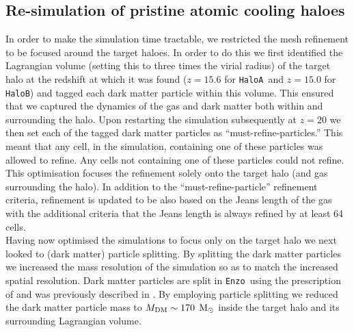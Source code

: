 \documentclass[graphics, twocolumn, usenatbib]{mn2e}
\newcommand{\enzo}{\texttt{Enzo~}}
\newcommand{\msolar} {$\rm{M_{\odot}}~$}
\newcommand{\ha} {\texttt{HaloA~}}
\newcommand{\hbc} {\texttt{HaloB}}
\begin{document}
 \subsection{Re-simulation of pristine atomic cooling haloes} \label{Sec:Resimulation}
In order to make the simulation time tractable, we restricted the mesh refinement to be focused
around the target haloes. In order to do this we first identified the Lagrangian
volume (setting this to three times the virial radius) of the target halo
at the redshift at which it was found ($z = 15.6$ for \ha and $z = 15.0$
 for \hbc) and tagged each dark matter particle within this volume. This ensured
 that we  captured the dynamics of the gas and dark matter both within and surrounding the halo.
 Upon restarting
 the simulation subsequently at $z = 20$ we then set each of the tagged dark matter particles as
 ``must-refine-particles.'' This meant that any cell, in the simulation, containing one of these
 particles was allowed to refine. Any cells not containing one of these particles could not refine.
 This optimisation focuses the refinement solely onto the target halo (and gas surrounding the halo).
 In addition to the ``must-refine-particle'' refinement criteria,  refinement is updated to be
 also based on the Jeans length of the
 gas with the additional criteria that the Jeans length is always refined by at least 64 cells. \\ 
 \indent Having now optimised the simulations to focus only on the target halo 
 we next looked to (dark matter) particle splitting. By splitting the dark matter
 particles we increased the mass resolution of the simulation so as to match the increased spatial
 resolution. Dark matter particles are split in \enzo using the prescription of
 \cite{Kitsionas_2002} and was previously described in \cite{Regan_2015}. By employing particle
 splitting we reduced the dark matter particle mass to $M_{\rm DM} \sim 170$ \msolar inside the
 target halo and its surrounding Lagrangian volume.
\end{document}
